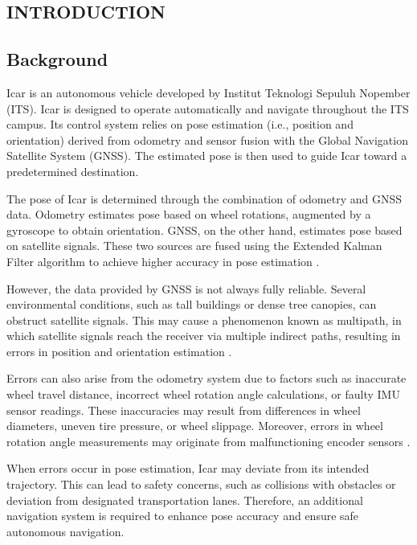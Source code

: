 \begin{spacing}{1.2}
	\chapter{INTRODUCTION}
  \end{spacing}
  
  \vspace{4ex}
  
  \section{Background}
  Icar is an autonomous vehicle developed by Institut Teknologi Sepuluh Nopember (ITS). Icar is designed to operate automatically and navigate throughout the ITS campus. Its control system relies on pose estimation (i.e., position and orientation) derived from odometry and sensor fusion with the Global Navigation Satellite System (GNSS). The estimated pose is then used to guide Icar toward a predetermined destination.
  
  \par
  The pose of Icar is determined through the combination of odometry and GNSS data. Odometry estimates pose based on wheel rotations, augmented by a gyroscope to obtain orientation. GNSS, on the other hand, estimates pose based on satellite signals. These two sources are fused using the Extended Kalman Filter algorithm to achieve higher accuracy in pose estimation \cite{ref_mas_marin}.
  
  \par 
  However, the data provided by GNSS is not always fully reliable. Several environmental conditions, such as tall buildings or dense tree canopies, can obstruct satellite signals. This may cause a phenomenon known as multipath, in which satellite signals reach the receiver via multiple indirect paths, resulting in errors in position and orientation estimation \cite{ref_gnss_multipath}.
  
  \par 
  Errors can also arise from the odometry system due to factors such as inaccurate wheel travel distance, incorrect wheel rotation angle calculations, or faulty IMU sensor readings. These inaccuracies may result from differences in wheel diameters, uneven tire pressure, or wheel slippage. Moreover, errors in wheel rotation angle measurements may originate from malfunctioning encoder sensors \cite{ref_odom_error}.
  
  \par
  When errors occur in pose estimation, Icar may deviate from its intended trajectory. This can lead to safety concerns, such as collisions with obstacles or deviation from designated transportation lanes. Therefore, an additional navigation system is required to enhance pose accuracy and ensure safe autonomous navigation.
  
